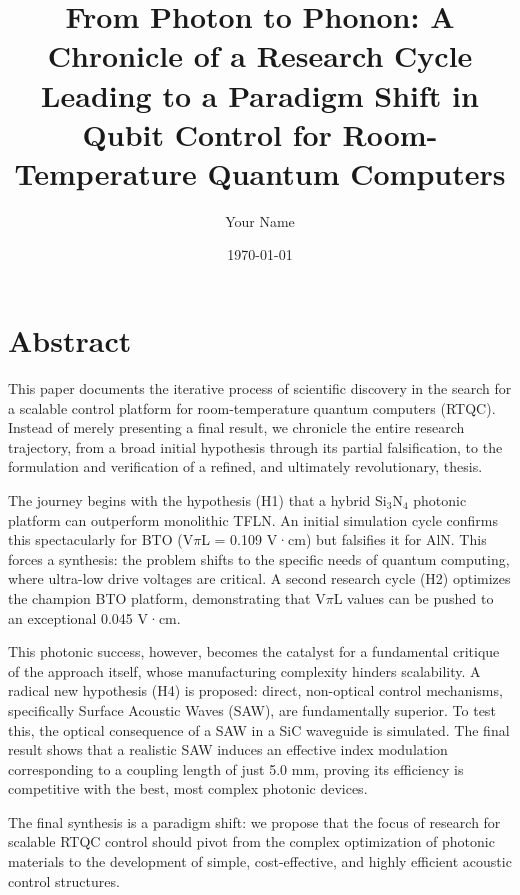 \documentclass[12pt, a4paper, numbers]{report}
\title{From Photon to Phonon: A Chronicle of a Research Cycle Leading to a Paradigm Shift in Qubit Control for Room-Temperature Quantum Computers}
\author{Your Name}
\date{\today}
\begin{document}

\maketitle
\tableofcontents
\listoffigures
\listoftables

\chapter*{Abstract}
This paper documents the iterative process of scientific discovery in the search for a scalable control platform for room-temperature quantum computers (RTQC). Instead of merely presenting a final result, we chronicle the entire research trajectory, from a broad initial hypothesis through its partial falsification, to the formulation and verification of a refined, and ultimately revolutionary, thesis.

The journey begins with the hypothesis (H1) that a hybrid Si$_3$N$_4$ photonic platform can outperform monolithic TFLN. An initial simulation cycle confirms this spectacularly for BTO (V$\pi$L = 0.109 V·cm) but falsifies it for AlN. This forces a synthesis: the problem shifts to the specific needs of quantum computing, where ultra-low drive voltages are critical. A second research cycle (H2) optimizes the champion BTO platform, demonstrating that V$\pi$L values can be pushed to an exceptional 0.045 V·cm.

This photonic success, however, becomes the catalyst for a fundamental critique of the approach itself, whose manufacturing complexity hinders scalability. A radical new hypothesis (H4) is proposed: direct, non-optical control mechanisms, specifically Surface Acoustic Waves (SAW), are fundamentally superior. To test this, the optical consequence of a SAW in a SiC waveguide is simulated. The final result shows that a realistic SAW induces an effective index modulation corresponding to a coupling length of just 5.0 mm, proving its efficiency is competitive with the best, most complex photonic devices.

The final synthesis is a paradigm shift: we propose that the focus of research for scalable RTQC control should pivot from the complex optimization of photonic materials to the development of simple, cost-effective, and highly efficient acoustic control structures.
\end{document}
